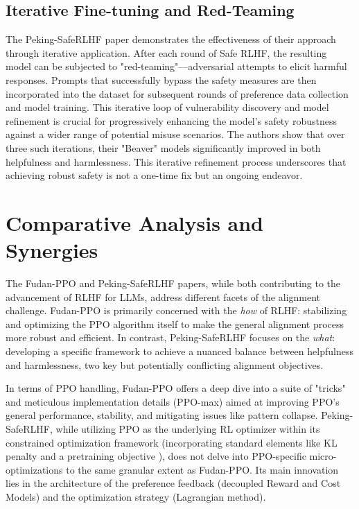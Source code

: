 \documentclass[10pt,journal,compsoc]{IEEEtran} %
\begin{document}
\subsection{Iterative Fine-tuning and Red-Teaming}
The Peking-SafeRLHF paper demonstrates the effectiveness of their approach through iterative application. After each round of Safe RLHF, the resulting model can be subjected to "red-teaming"—adversarial attempts to elicit harmful responses. Prompts that successfully bypass the safety measures are then incorporated into the dataset for subsequent rounds of preference data collection and model training. \cite{Dai2023SafeRLHF} This iterative loop of vulnerability discovery and model refinement is crucial for progressively enhancing the model's safety robustness against a wider range of potential misuse scenarios. The authors show that over three such iterations, their "Beaver" models significantly improved in both helpfulness and harmlessness. \cite{Dai2023SafeRLHF} This iterative refinement process underscores that achieving robust safety is not a one-time fix but an ongoing endeavor.

\section{Comparative Analysis and Synergies}
\label{sec:comparative}

The Fudan-PPO \cite{Zheng2023PPO} and Peking-SafeRLHF \cite{Dai2023SafeRLHF} papers, while both contributing to the advancement of RLHF for LLMs, address different facets of the alignment challenge. Fudan-PPO is primarily concerned with the \textit{how} of RLHF: stabilizing and optimizing the PPO algorithm itself to make the general alignment process more robust and efficient. In contrast, Peking-SafeRLHF focuses on the \textit{what}: developing a specific framework to achieve a nuanced balance between helpfulness and harmlessness, two key but potentially conflicting alignment objectives.

In terms of PPO handling, Fudan-PPO offers a deep dive into a suite of "tricks" and meticulous implementation details (PPO-max) aimed at improving PPO's general performance, stability, and mitigating issues like pattern collapse. Peking-SafeRLHF, while utilizing PPO as the underlying RL optimizer within its constrained optimization framework (incorporating standard elements like KL penalty and a pretraining objective \cite{Dai2023SafeRLHF}), does not delve into PPO-specific micro-optimizations to the same granular extent as Fudan-PPO. Its main innovation lies in the architecture of the preference feedback (decoupled Reward and Cost Models) and the optimization strategy (Lagrangian method).
\end{document}
